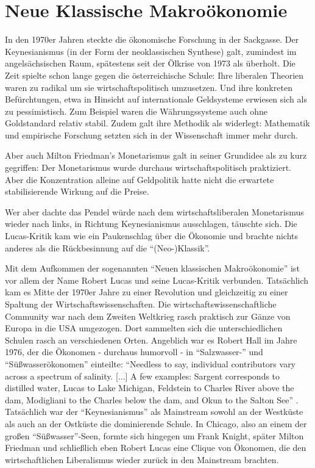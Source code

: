 %
%
%

\chapter{Neue Klassische Makroökonomie}
\label{Neue Makro}

In den 1970er Jahren steckte die ökonomische Forschung in der Sackgasse. Der Keynesianismus (in der Form der neoklassischen Synthese) galt, zumindest im angelsächsischen Raum, spätestens seit der Ölkrise von 1973 als überholt. Die Zeit spielte schon lange gegen die österreichische Schule: Ihre liberalen Theorien waren zu radikal um sie wirtschaftspolitisch umzusetzen. Und ihre konkreten Befürchtungen, etwa in Hinsicht auf internationale Geldsysteme erwiesen sich als zu pessimistisch. Zum Beispiel waren die Währungssysteme auch ohne Goldstandard relativ stabil. Zudem galt ihre Methodik als widerlegt: Mathematik und empirische Forschung setzten sich in der Wissenschaft immer mehr durch. 

Aber auch Milton Friedman's Monetarismus galt in seiner Grundidee als zu kurz gegriffen: Der Monetarismus wurde durchaus wirtschaftspolitisch praktiziert. Aber die Konzentration alleine auf Geldpolitik hatte nicht die erwartete stabilisierende Wirkung auf die Preise.

Wer aber dachte das Pendel würde nach dem wirtschaftsliberalen Monetarismus wieder nach links, in Richtung Keynesianismus ausschlagen, täuschte sich. Die Lucas-Kritik kam wie ein Paukenschlag über die Ökonomie und brachte nichts anderes als die Rückbesinnung auf die "`(Neo-)Klassik"'.

Mit dem Aufkommen der sogenannten "`Neuen klassischen Makroökonomie"' ist vor allem der Name Robert Lucas und seine Lucas-Kritik \parencite{Lucas1976} verbunden. Tatsächlich kam es Mitte der 1970er Jahre zu einer Revolution und gleichzeitig zu einer Spaltung der Wirtschaftswissenschaften. Die wirtschaftswissenschaftliche Community war nach dem Zweiten Weltkrieg rasch praktisch zur Gänze von Europa in die USA umgezogen. Dort sammelten sich die unterschiedlichen Schulen rasch an verschiedenen Orten. Angeblich war es Robert Hall im Jahre 1976, der die Ökonomen - durchaus humorvoll - in "`Salzwasser-"' und "`Süßwasserökonomen"' einteilte: "`Needless to say, individual contributors vary across a spectrum of salinity. [...] A few examples: Sargent corresponds to distilled water, Lucas to Lake Michigan, Feldstein to Charles River above the dam, Modigliani to the Charles below the dam, and Okun to the Salton See"' \parencite[S. 1]{Hall1976}. Tatsächlich war der "`Keynesianismus"' als Mainstream sowohl an der Westküste als auch an der Ostküste die dominierende Schule. In Chicago, also an einem der großen "`Süßwasser"'-Seen, formte sich hingegen um Frank Knight, später Milton Friedman und schließlich eben Robert Lucas eine Clique von Ökonomen, die den wirtschaftlichen Liberalismus wieder zurück in den Mainstream brachten.

